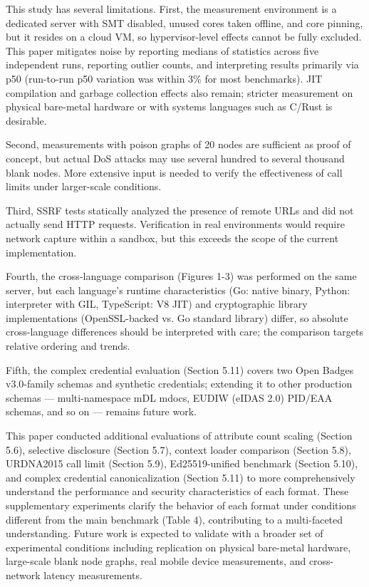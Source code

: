 \documentclass[conference]{IEEEtran}
\begin{document}
This study has several limitations. First, the measurement environment is a dedicated server with SMT disabled, unused cores taken offline, and core pinning, but it resides on a cloud VM, so hypervisor-level effects cannot be fully excluded. This paper mitigates noise by reporting medians of statistics across five independent runs, reporting outlier counts, and interpreting results primarily via p50 (run-to-run p50 variation was within 3\% for most benchmarks). JIT compilation and garbage collection effects also remain; stricter measurement on physical bare-metal hardware or with systems languages such as C/Rust is desirable.

Second, measurements with poison graphs of 20 nodes are sufficient as proof of concept, but actual DoS attacks may use several hundred to several thousand blank nodes. More extensive input is needed to verify the effectiveness of call limits under larger-scale conditions.

Third, SSRF tests statically analyzed the presence of remote URLs and did not actually send HTTP requests. Verification in real environments would require network capture within a sandbox, but this exceeds the scope of the current implementation.

Fourth, the cross-language comparison (Figures 1-3) was performed on the same server, but each language's runtime characteristics (Go: native binary, Python: interpreter with GIL, TypeScript: V8 JIT) and cryptographic library implementations (OpenSSL-backed vs. Go standard library) differ, so absolute cross-language differences should be interpreted with care; the comparison targets relative ordering and trends.

Fifth, the complex credential evaluation (Section 5.11) covers two Open Badges v3.0-family schemas and synthetic credentials; extending it to other production schemas --- multi-namespace mDL mdocs, EUDIW (eIDAS 2.0) PID/EAA schemas, and so on --- remains future work.

This paper conducted additional evaluations of attribute count scaling (Section 5.6), selective disclosure (Section 5.7), context loader comparison (Section 5.8), URDNA2015 call limit (Section 5.9), Ed25519-unified benchmark (Section 5.10), and complex credential canonicalization (Section 5.11) to more comprehensively understand the performance and security characteristics of each format. These supplementary experiments clarify the behavior of each format under conditions different from the main benchmark (Table 4), contributing to a multi-faceted understanding. Future work is expected to validate with a broader set of experimental conditions including replication on physical bare-metal hardware, large-scale blank node graphs, real mobile device measurements, and cross-network latency measurements.
\end{document}
